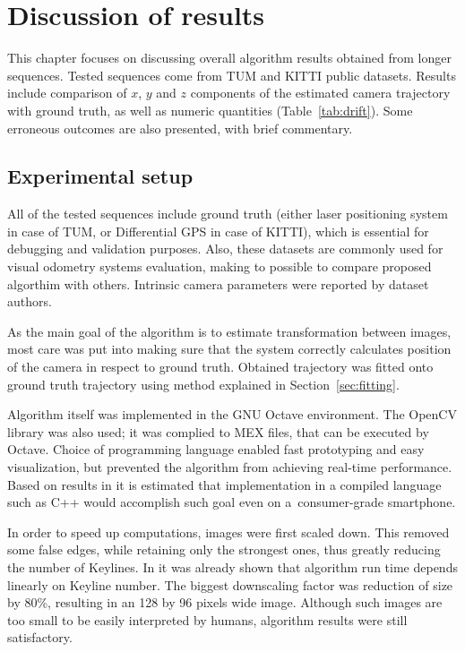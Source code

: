 \chapter{Discussion of results}
\label{cha:results}

This chapter focuses on discussing overall algorithm results obtained from longer sequences. Tested sequences come from TUM \cite{tum} and KITTI \cite{kitti} public datasets. Results include comparison of $x$, $y$ and $z$ components of the estimated camera trajectory with ground truth, as well as numeric quantities (Table~\ref{tab:drift}). Some erroneous outcomes are also presented, with brief commentary.

\section{Experimental setup}

All of the tested sequences include ground truth (either laser positioning system in case of TUM, or  Differential GPS in case of KITTI), which is essential for debugging and validation purposes. Also, these datasets are commonly used for visual odometry systems evaluation, making to possible to compare proposed algorthim with others. Intrinsic camera parameters were reported by dataset authors.

As the main goal of the algorithm is to estimate transformation between images, most care was put into making sure that the system correctly calculates position of the camera in respect to ground truth. Obtained trajectory was fitted onto ground truth trajectory using method explained in Section~\ref{sec:fitting}.

Algorithm itself was implemented in the GNU Octave environment. The OpenCV \cite{opencv} library was also used; it was complied to MEX files, that can be executed by Octave. Choice of programming language enabled fast prototyping and easy visualization, but prevented the algorithm from achieving real-time performance. Based on results in \cite{jose2015realtime} it is estimated that implementation in a compiled language such as C++ would accomplish such goal even on a~consumer-grade smartphone.

In order to speed up computations, images were first scaled down. This removed some false edges, while retaining only the strongest ones, thus greatly reducing the number of Keylines. In \cite{jose2015realtime} it was already shown that algorithm run time depends linearly on Keyline number. The biggest downscaling factor was reduction of size by 80\%, resulting in an 128 by 96 pixels wide image. Although such images are too small to be easily interpreted by humans, algorithm results were still satisfactory.

